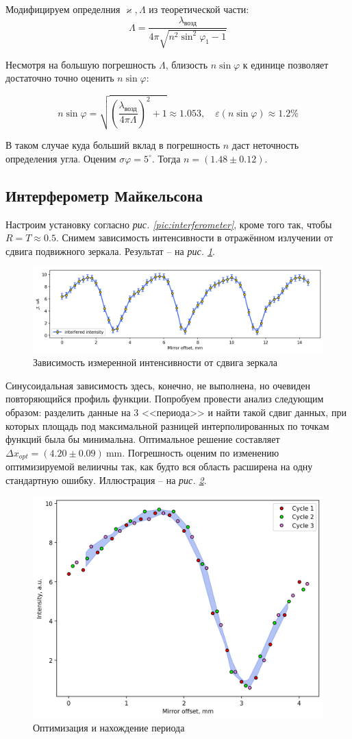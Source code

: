 \documentclass[12pt, a4paper]{article}
\newcommand{\mim}{~\mathrm{mm}}
\begin{document}
Модифицируем определния $\varkappa, \Lambda$ из теоретической части:
\[\Lambda = \frac{\lambda_\text{возд}}{4\pi\sqrt{n^2 \sin^2 \varphi_1  - 1}}\]

Несмотря на большую погрешность $\Lambda$, близость $n\sin \varphi$ к единице позволяет достаточно точно оценить $n\sin\varphi$:

\[n\sin\varphi = \sqrt{\left( \frac{\lambda_\text{возд}}{4\pi \Lambda} \right)^2 + 1} \approx 1.053,\quad \varepsilon(n\sin \varphi) \approx 1.2\%\]

В таком случае куда больший вклад в погрешность $n$ даст неточность определения угла. Оценим $\sigma{\varphi} = 5^\circ$.
Тогда $n = (1.48\pm0.12)$.

\subsection{Интерферометр Майкельсона}
Настроим установку согласно \textit{рис. \ref{pic:interferometer}}, кроме того так, чтобы $R=T\approx 0.5$.
Снимем зависимость интенсивности в отражённом излучении от сдвига подвижного зеркала. Результат -- на \textit{рис. \ref{pic:interfere}}.
\begin{figure}[H]
  \includegraphics[width=0.8\linewidth]{pics/interfere-raw.png}
  \caption{Зависимость измеренной интенсивности от сдвига зеркала}
  \label{pic:interfere}
\end{figure}
Синусоидальная зависимость здесь, конечно, не выполнена, но очевиден повторяющийся профиль функции.
Попробуем провести анализ следующим образом: разделить данные на 3 <<периода>>
и найти такой сдвиг данных, при которых площадь под максимальной разницей интерполированных по точкам функций была бы минимальна.
Оптимальное решение составляет $\Delta x_{opt} = (4.20\pm0.09)\mim$. Погрешность оценим по изменению оптимизируемой велиичны
так, как будто вся область расширена на одну стандартную ошибку.
Иллюстрация -- на \textit{рис. \ref{pic:optimization}}.
\begin{figure}[H]
  \includegraphics[width=0.65\linewidth]{pics/interfere-offset.png}
  \caption{Оптимизация и нахождение периода}
  \label{pic:optimization}
\end{figure}
\end{document}
